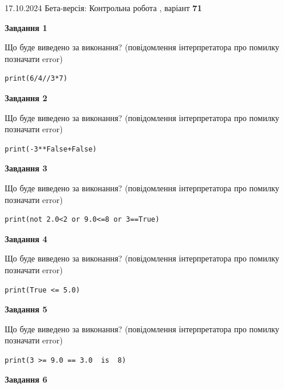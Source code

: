 \documentclass[12pt, ukrainian]{article}
\begin{document}
{\Large{17.10.2024 Бета-версія: Контрольна робота , варіант  \No \textbf { 71 }\par}}
{
\begin {large}
{\begin {center}\textbf{Завдання 1}\end {center}}

Що буде виведено за виконання? (повідомлення інтерпретатора про помилку позначати error)\par
\begin{verbatim}
print(6/4//3*7)
\end{verbatim}

{\begin {center}\textbf{Завдання 2}\end {center}}

Що буде виведено за виконання? (повідомлення інтерпретатора про помилку позначати error)\par
\begin{verbatim}
print(-3**False+False)
\end{verbatim}

{\begin {center}\textbf{Завдання 3}\end {center}}

Що буде виведено за виконання? (повідомлення інтерпретатора про помилку позначати error)\par
\begin{verbatim}
print(not 2.0<2 or 9.0<=8 or 3==True)
\end{verbatim}

{\begin {center}\textbf{Завдання 4}\end {center}}

Що буде виведено за виконання? (повідомлення інтерпретатора про помилку позначати error)\par
\begin{verbatim}
print(True <= 5.0)
\end{verbatim}

{\begin {center}\textbf{Завдання 5}\end {center}}

Що буде виведено за виконання? (повідомлення інтерпретатора про помилку позначати error)\par
\begin{verbatim}
print(3 >= 9.0 == 3.0  is  8)
\end{verbatim}

{\begin {center}\textbf{Завдання 6}\end {center}}


\end{large}}
\end{document}
